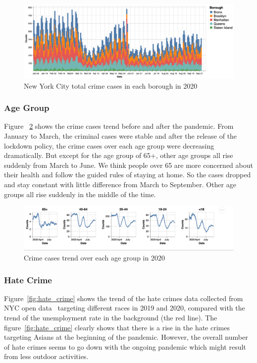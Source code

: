\documentclass[conference]{IEEEtran}
\begin{document}
\begin{figure}[ht!]
    \centering
    \includegraphics[width=\linewidth]{images/totalCrimeCases.png}
    \caption{New York City total crime cases in each borough in 2020}
    \label{fig:totalCrimeCases_2020}
\end{figure}


\subsubsection{Age Group}
Figure ~\ref{fig:AgeGroup_2020} shows the crime cases trend before and after the pandemic.  From January to March, the criminal cases were stable and after the release of the lockdown policy, the crime cases over each age group were decreasing dramatically. But except for the age group of 65+,  other age groups all rise suddenly from March to June. We think people over 65 are more concerned about their health and follow the guided rules of staying at home. So the cases dropped and stay constant with little difference from March to September. Other age groups all rise suddenly in the middle of the time.

\begin{figure}[ht!]
    \centering
    \includegraphics[width=\linewidth]{images/AgeGroup.png}
    \caption{Crime cases trend over each age group in 2020}
    \label{fig:AgeGroup_2020}
\end{figure}

\subsubsection{Hate Crime}
Figure~\ref{fig:hate_crime} shows the trend of the hate crimes data collected from NYC open data~\cite{NYPD2020hatecrimes} targeting different races in 2019 and 2020, compared with the trend of the unemployment rate in the background (the red line).
The figure~\ref{fig:hate_crime} clearly shows that there is a rise in the hate crimes targeting Asians at the beginning of the pandemic. However, the overall number of hate crimes seems to go down with the ongoing pandemic which might result from less outdoor activities.
\end{document}
